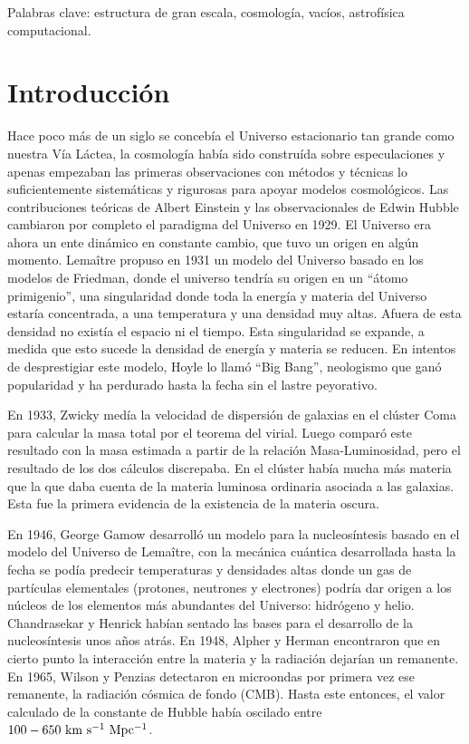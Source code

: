 \documentclass[preprint]{aastex62}
\begin{document}
  \medskip

  Palabras clave: estructura de gran escala, cosmología, vacíos,
  astrofísica computacional.


  \section{Introducción}

  Hace poco más de un siglo se concebía el Universo estacionario tan grande como nuestra
  Vía Láctea, la cosmología había sido construída sobre especulaciones y apenas empezaban
  las primeras observaciones con métodos y técnicas lo suficientemente sistemáticas y
  rigurosas para apoyar modelos cosmológicos.
  Las contribuciones teóricas de Albert Einstein y las observacionales de Edwin 
  Hubble cambiaron por completo el paradigma del Universo en 1929. El Universo era ahora un ente
  dinámico en constante cambio, que tuvo un origen en algún momento. Lemaître propuso
  en 1931  un modelo del Universo basado en los modelos de Friedman, donde el universo tendría
  su origen en un ``átomo primigenio'', una singularidad donde toda la energía y materia
  del Universo estaría concentrada, a una temperatura y una densidad muy altas. Afuera
  de esta densidad no existía el espacio ni el tiempo. Esta singularidad se expande,
  a medida que esto sucede la densidad de energía y materia se reducen.
  En intentos de desprestigiar este modelo, Hoyle lo llamó  ``Big Bang'',
  neologismo que ganó popularidad y ha perdurado hasta la fecha sin el lastre peyorativo.

  En 1933, Zwicky medía la velocidad de dispersión de galaxias en el clúster Coma
  para calcular la masa total por el teorema del virial. Luego comparó este resultado
  con la masa estimada a partir de la relación Masa-Luminosidad, pero el resultado de
  los dos cálculos discrepaba. En el clúster había mucha más materia que la que daba cuenta
  de la materia luminosa ordinaria  asociada a las galaxias. Esta fue la primera evidencia de la
  existencia de la materia oscura.

  En 1946, George Gamow desarrolló un modelo para la nucleosíntesis basado en el modelo
  del Universo de Lemaître, con la mecánica cuántica desarrollada hasta la fecha se
  podía predecir temperaturas y densidades altas donde un gas de partículas elementales
  (protones, neutrones y electrones) podría dar origen a los núcleos de los elementos
  más abundantes del Universo: hidrógeno y helio. Chandrasekar y Henrick habían sentado las
  bases para el desarrollo de la nucleosíntesis unos años atrás.  En 1948, Alpher y Herman
  encontraron que en cierto punto la interacción entre la materia y la radiación dejarían
  un remanente. En 1965, Wilson y Penzias detectaron en microondas  por primera vez ese
  remanente, la radiación cósmica de fondo (CMB). Hasta este entonces, el valor calculado
  de la constante de Hubble había oscilado entre $100-650 \rm~km~s^{-1}~Mpc^{-1}$.
  
\end{document}
